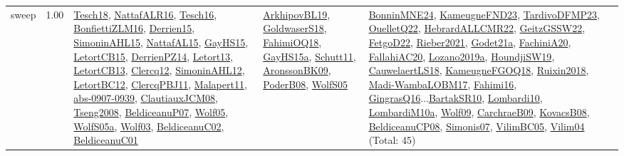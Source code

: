 {\begin{longtable}{p{3cm}r>{\raggedright\arraybackslash}p{6cm}>{\raggedright\arraybackslash}p{6cm}>{\raggedright\arraybackslash}p{8cm}}
\index{sweep}\index{Algorithms!sweep}sweep &  1.00 & \hyperref[detail:Tesch18]{Tesch18}, \hyperref[detail:NattafALR16]{NattafALR16}, \hyperref[detail:Tesch16]{Tesch16}, \hyperref[detail:BonfiettiZLM16]{BonfiettiZLM16}, \hyperref[detail:Derrien15]{Derrien15}, \hyperref[detail:SimoninAHL15]{SimoninAHL15}, \hyperref[detail:NattafAL15]{NattafAL15}, \hyperref[detail:GayHS15]{GayHS15}, \hyperref[detail:LetortCB15]{LetortCB15}, \hyperref[detail:DerrienPZ14]{DerrienPZ14}, \hyperref[detail:Letort13]{Letort13}, \hyperref[detail:LetortCB13]{LetortCB13}, \hyperref[detail:Clercq12]{Clercq12}, \hyperref[detail:SimoninAHL12]{SimoninAHL12}, \hyperref[detail:LetortBC12]{LetortBC12}, \hyperref[detail:ClercqPBJ11]{ClercqPBJ11}, \hyperref[detail:Malapert11]{Malapert11}, \hyperref[detail:abs-0907-0939]{abs-0907-0939}, \hyperref[detail:ClautiauxJCM08]{ClautiauxJCM08}, \hyperref[detail:Tseng2008]{Tseng2008}, \hyperref[detail:BeldiceanuP07]{BeldiceanuP07}, \hyperref[detail:Wolf05]{Wolf05}, \hyperref[detail:WolfS05a]{WolfS05a}, \hyperref[detail:Wolf03]{Wolf03}, \hyperref[detail:BeldiceanuC02]{BeldiceanuC02}, \hyperref[detail:BeldiceanuC01]{BeldiceanuC01} & \hyperref[detail:ArkhipovBL19]{ArkhipovBL19}, \hyperref[detail:GoldwaserS18]{GoldwaserS18}, \hyperref[detail:FahimiOQ18]{FahimiOQ18}, \hyperref[detail:GayHS15a]{GayHS15a}, \hyperref[detail:Schutt11]{Schutt11}, \hyperref[detail:AronssonBK09]{AronssonBK09}, \hyperref[detail:PoderB08]{PoderB08}, \hyperref[detail:WolfS05]{WolfS05} & \hyperref[detail:BonninMNE24]{BonninMNE24}, \hyperref[detail:KameugneFND23]{KameugneFND23}, \hyperref[detail:TardivoDFMP23]{TardivoDFMP23}, \hyperref[detail:OuelletQ22]{OuelletQ22}, \hyperref[detail:HebrardALLCMR22]{HebrardALLCMR22}, \hyperref[detail:GeitzGSSW22]{GeitzGSSW22}, \hyperref[detail:FetgoD22]{FetgoD22}, \hyperref[detail:Rieber2021]{Rieber2021}, \hyperref[detail:Godet21a]{Godet21a}, \hyperref[detail:FachiniA20]{FachiniA20}, \hyperref[detail:FallahiAC20]{FallahiAC20}, \hyperref[detail:Lozano2019a]{Lozano2019a}, \hyperref[detail:HoundjiSW19]{HoundjiSW19}, \hyperref[detail:CauwelaertLS18]{CauwelaertLS18}, \hyperref[detail:KameugneFGOQ18]{KameugneFGOQ18}, \hyperref[detail:Ruixin2018]{Ruixin2018}, \hyperref[detail:Madi-WambaLOBM17]{Madi-WambaLOBM17}, \hyperref[detail:Fahimi16]{Fahimi16}, \hyperref[detail:GingrasQ16]{GingrasQ16}...\hyperref[detail:BartakSR10]{BartakSR10}, \hyperref[detail:Lombardi10]{Lombardi10}, \hyperref[detail:LombardiM10a]{LombardiM10a}, \hyperref[detail:Wolf09]{Wolf09}, \hyperref[detail:CarchraeB09]{CarchraeB09}, \hyperref[detail:KovacsB08]{KovacsB08}, \hyperref[detail:BeldiceanuCP08]{BeldiceanuCP08}, \hyperref[detail:Simonis07]{Simonis07}, \hyperref[detail:VilimBC05]{VilimBC05}, \hyperref[detail:Vilim04]{Vilim04} (Total: 45)\\

\end{longtable}}
